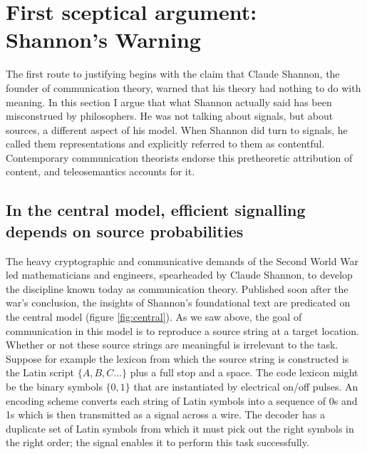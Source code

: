 \documentclass[12pt]{article}
\begin{document}

\section{First sceptical argument: Shannon's Warning}\label{sec:warning}

The first route to justifying \tic{} begins with the claim that Claude Shannon, the founder of communication theory, warned that his theory had nothing to do with meaning.
In this section I argue that what Shannon actually said has been misconstrued by philosophers.
He was not talking about signals, but about sources, a different aspect of his model.
When Shannon did turn to signals, he called them representations and explicitly referred to them as contentful.
Contemporary communication theorists endorse this pretheoretic attribution of content, and teleosemantics accounts for it.



\subsection{In the central model, efficient signalling depends on source probabilities}
The heavy cryptographic and communicative demands of the Second World War led mathematicians and engineers, spearheaded by Claude Shannon, to develop the discipline known today as communication theory.
Published soon after the war's conclusion, the insights of Shannon's foundational text \parencite*{shannon1948mathematicalc} are predicated on the central model (figure \ref{fig:central}).
As we saw above, the goal of communication in this model is to reproduce a source string at a target location.
Whether or not these source strings are meaningful is irrelevant to the task.
Suppose for example the lexicon from which the source string is constructed is the Latin script $\{A,B,C...\}$ plus a full stop and a space.
The code lexicon might be the binary symbols $\{0,1\}$ that are instantiated by electrical on/off pulses.
An encoding scheme converts each string of Latin symbols into a sequence of 0s and 1s which is then transmitted as a signal across a wire.
The decoder has a duplicate set of Latin symbols from which it must pick out the right symbols in the right order; the signal enables it to perform this task successfully.
\end{document}
